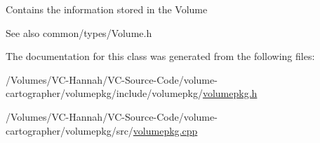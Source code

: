 Contains the information stored in the Volume \begin{DoxySeeAlso}{See also}
common/types/\+Volume.\+h 
\end{DoxySeeAlso}


The documentation for this class was generated from the following files\+:\begin{DoxyCompactItemize}
\item 
/\+Volumes/\+V\+C-\/\+Hannah/\+V\+C-\/\+Source-\/\+Code/volume-\/cartographer/volumepkg/include/volumepkg/\hyperlink{volumepkg_8h}{volumepkg.\+h}\item 
/\+Volumes/\+V\+C-\/\+Hannah/\+V\+C-\/\+Source-\/\+Code/volume-\/cartographer/volumepkg/src/\hyperlink{volumepkg_8cpp}{volumepkg.\+cpp}\end{DoxyCompactItemize}
